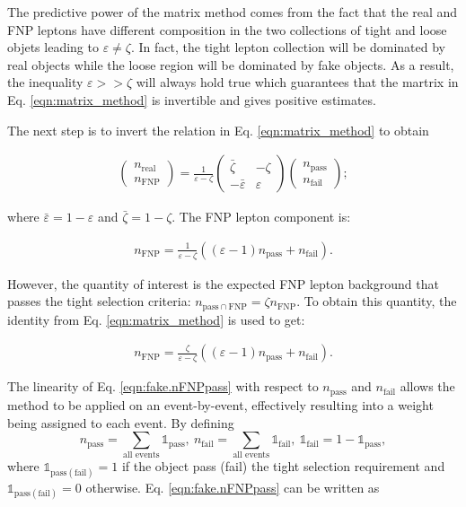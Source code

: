 The predictive power of the matrix method comes from the fact that 
the real and FNP leptons have different composition in the two collections 
of tight and loose objets leading to $\varepsilon \neq \zeta$. In fact, 
the tight lepton collection will be dominated by real objects while the 
loose region will be dominated by fake objects. As a result, 
the inequality $\varepsilon >> \zeta$ will always hold true which 
guarantees that the martrix in Eq. \ref{eqn:matrix_method} is invertible 
and gives positive estimates. 

The next step is to invert the relation in Eq. \ref{eqn:matrix_method} to 
obtain

\begin{align}
\begin{pmatrix}n_\text{real}\\n_\text{FNP}\end{pmatrix} 
= \frac{1}{\varepsilon - \zeta} \begin{pmatrix}\bar\zeta & -\zeta\\ -\bar\varepsilon & \varepsilon\end{pmatrix}
\begin{pmatrix}n_\text{pass}\\n_\text{fail}\end{pmatrix}; 
\label{eqn:fake.inv_matrix_method}
\end{align}

where $\bar\varepsilon = 1 - \varepsilon$ and  $\bar\zeta = 1 - \zeta$. 
The FNP lepton component is: 

\begin{align}
n_\text{FNP} = \frac{1}{\varepsilon - \zeta}\left(\left(\varepsilon-1\right)n_\text{pass}+n_\text{fail}\right).
\label{eqn:fake.nfake}
\end{align}

However, the quantity of interest is the expected FNP lepton background that 
passes the tight selection criteria: 
$n_{\text{pass}~\cap~\text{FNP}} = \zeta n_\text{FNP}$.
 To obtain this quantity, 
the identity from Eq. \ref{eqn:matrix_method} is used to get:

\begin{align}
n_\text{FNP} = \frac{\zeta}{\varepsilon - \zeta}\left(\left(\varepsilon-1\right)n_\text{pass}+n_\text{fail}\right).
\label{eqn:fake.nFNPpass}
\end{align}

The linearity of Eq. \ref{eqn:fake.nFNPpass}  with respect to $n_\text{pass}$ 
and $n_\text{fail}$ allows the method to be applied on an event-by-event, 
effectively resulting into a weight being assigned to each event. 
By defining
\[
  n_\text{pass} = \sum_\text{all events} \mathbb{1}_\text{pass},~
  n_\text{fail} = \sum_\text{all events} \mathbb{1}_\text{fail},~ 
  \mathbb{1}_\text{fail} = 1 -  \mathbb{1}_\text{pass},
\]
where $\mathbb{1}_{\text{pass} \left(\text{fail}\right)} = 1$ if the object pass (fail) the tight selection requirement and $\mathbb{1}_{\text{pass}\left(\text{fail}\right)} = 0$ otherwise. Eq. \ref{eqn:fake.nFNPpass} can be written as


